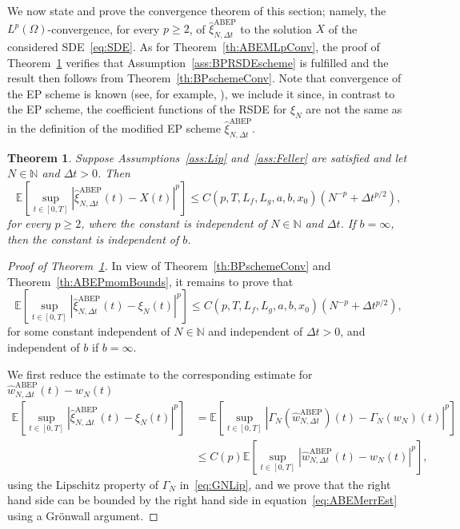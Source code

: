 \documentclass[11pt]{amsart}
\newtheorem{theorem}{Theorem}
\newcommand{\E}{{\mathbb E}}
\newcommand{\xiNDt}{\hat{\xi}_{N,\Delta t}}
\newcommand{\ABEP}{\textrm{ABEP}}
\begin{document}
{We now state and prove the convergence theorem of this section; namely, the $L^{p}(\Omega)$-convergence, for every $p \geq 2$, of $\hat{\xi}^{\ABEP}_{N,\Delta t}$ to the solution $X$ of the considered SDE~\eqref{eq:SDE}. As for Theorem~\ref{th:ABEMLpConv}, the proof of Theorem~\ref{th:ABEPLpConv} verifies that Assumption~\ref{ass:BPRSDEscheme} is fulfilled and the result then follows from Theorem~\ref{th:BPschemeConv}. Note that convergence of the EP scheme is known (see, for example, \cite{SLOMINSKI1994197}), we include it since, in contrast to the EP scheme, the coefficient functions of the RSDE for $\xi_{N}$ are not the same as in the definition of the modified EP scheme $\hat{\xi}^{\ABEP}_{N,\Delta t}$.
\begin{theorem}\label{th:ABEPLpConv}
Suppose Assumptions~\ref{ass:Lip} and~\ref{ass:Feller} are satisfied and let $N \in \mathbb{N}$ and $\Delta t>0$. Then
\begin{equation*}
\E \left[ \sup_{t \in [0,T]} \left| \hat{\xi}^{\ABEP}_{N,\Delta t}(t) - X(t) \right|^{p} \right] \leq C(p,T,L_{f},L_{g},a,b,x_{0}) \left( N^{-p} + \Delta t^{p/2} \right),
\end{equation*}
for every $p \geq 2$, where the constant is independent of $N \in \mathbb{N}$ and $\Delta t$. If $b=\infty$, then the constant is independent of $b$.
\end{theorem}
\begin{proof}[Proof of Theorem~\ref{th:ABEPLpConv}]
In view of Theorem~\ref{th:BPschemeConv} and Theorem~\ref{th:ABEPmomBounds}, it remains to prove that
\begin{equation}\label{eq:ABEMerrEst}
\E \left[ \sup_{t \in [0,T]} |\hat{\xi}^{\ABEP}_{N,\Delta t}(t) - \xi_{N}(t)|^{p} \right] \leq C(p,T,L_{f},L_{g},a,b,x_{0}) \left( N^{-p} + \Delta t^{p/2} \right),
\end{equation}
for some constant independent of $N \in \mathbb{N}$ and independent of $\Delta t>0$, and independent of $b$ if $b=\infty$.  

We first reduce the estimate to the corresponding estimate for $\hat{w}_{N,\Delta t}^{\ABEP}(t) - w_{N}(t)$
\begin{align*}
\E \left[ \sup_{t \in [0,T]} |\xiNDt^{\ABEP}(t) - \xi_{N}(t)|^{p} \right] &= \E \left[ \sup_{t \in [0,T]} |\Gamma_{N}(\hat{w}_{N,\Delta t}^{\ABEP})(t) - \Gamma_{N} (w_{N})(t) |^{p} \right] \\ &\leq C(p) \E \left[ \sup_{t \in [0,T]} |\hat{w}_{N,\Delta t}^{\ABEP}(t) - w_{N}(t)|^{p} \right],
\end{align*}
using the Lipschitz property of $\Gamma_{N}$ in~\eqref{eq:GNLip}, and we prove that the right hand side can be bounded by the right hand side in equation~\eqref{eq:ABEMerrEst} using a Grönwall argument.


\end{proof}}
\end{document}

